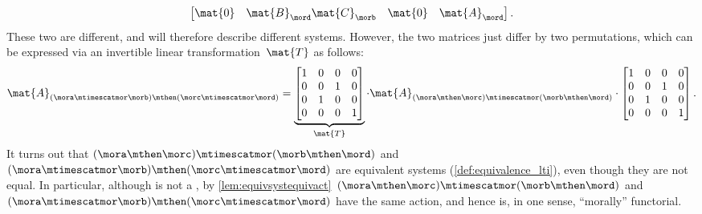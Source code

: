 \begin{example}
\begin{equation}
\begin{bmatrix}
            \mat{0}                     & \mat{B}_\mord \mat{C}_\morb & \mat{0}       & \mat{A}_\mord
        \end{bmatrix}.
    \end{equation}
    These two are different, and will therefore describe different systems.
    However, the two matrices just differ by two permutations, which can be expressed via an invertible linear transformation~$\mat{T}$ as follows:
    \begin{equation}\label{eq:checking-LTI-functorial-stacking-3}
        \mat{A}_{(\mora\mtimescatmor \morb)\mthen (\morc\mtimescatmor \mord)}=
        \underbrace{\begin{bmatrix}
                1 & 0 & 0 & 0 \\
                0 & 0 & 1 & 0 \\
                0 & 1 & 0 & 0 \\
                0 & 0 & 0 & 1
            \end{bmatrix}}_{\mat{T}}\cdot
        \mat{A}_{(\mora \mthen \morc)\mtimescatmor (\morb\mthen \mord)}
        \cdot
        \begin{bmatrix}
            1 & 0 & 0 & 0 \\
            0 & 0 & 1 & 0 \\
            0 & 1 & 0 & 0 \\
            0 & 0 & 0 & 1
        \end{bmatrix}.
    \end{equation}
    It turns out that $(\mora \mthen \morc)\mtimescatmor (\morb\mthen \mord)$ and~$(\mora\mtimescatmor \morb)\mthen (\morc\mtimescatmor \mord)$ are equivalent systems (\cref{def:equivalence_lti}), even though they are not equal.
    In particular, although \LTI is not a , by \cref{lem:equivsystequivact}~$(\mora \mthen \morc)\mtimescatmor (\morb\mthen \mord)$ and~$(\mora\mtimescatmor \morb)\mthen (\morc\mtimescatmor \mord)$ have the same action, and hence \LTI is, in one sense, ``morally'' functorial.
\end{example}

